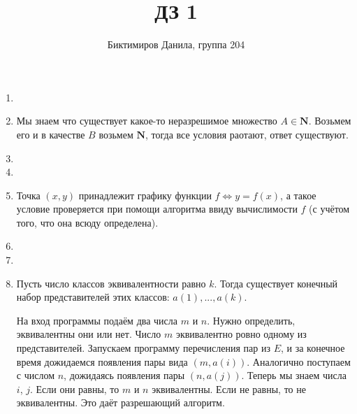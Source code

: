 \documentclass[11pt]{article}
\begin{document}
	
	\author{Биктимиров Данила, группа 204}
	\title{ДЗ 1}
	\date{}
	\maketitle
	
	\medskip
	
	\begin{enumerate}
		
		\item 
		
		
		\item Мы знаем что существует какое-то неразрешимое множество $A\in \mathbf{N}$. Возьмем его и в качестве $B$ возьмем $\mathbf{N}$, тогда все условия раотают, ответ существуют.
		\item 
		
		\item
		
		\item Точка $(x,y)$ принадлежит графику функции $f \Leftrightarrow y=f(x)$, а такое условие проверяется при помощи алгоритма ввиду вычислимости $f$ (с учётом того, что она всюду определена).
		\item
		
		\item 
		
		
		\item Пусть число классов эквивалентности равно $k$. Тогда существует конечный набор представителей этих классов: $a(1), ... , a(k)$.
		
		На вход программы подаём два числа $m$ и $n$. Нужно определить, эквивалентны они или нет. Число $m$ эквивалентно ровно одному из представителей. Запускаем программу перечисления пар из $E$, и за конечное время дожидаемся появления пары вида $(m,a(i))$. Аналогично поступаем с числом $n$, дожидаясь появления пары $(n,a(j))$. Теперь мы знаем числа $i$, $j$. Если они равны, то $m$ и $n$ эквивалентны. Если не равны, то не эквивалентны. Это даёт разрешающий алгоритм.
		
		
		
	\end{enumerate}
\end{document}
